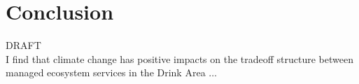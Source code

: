 \section{Conclusion}

DRAFT\\
I find that climate change has positive impacts on the tradeoff structure between managed ecosystem services in the Drink Area $\ldots$